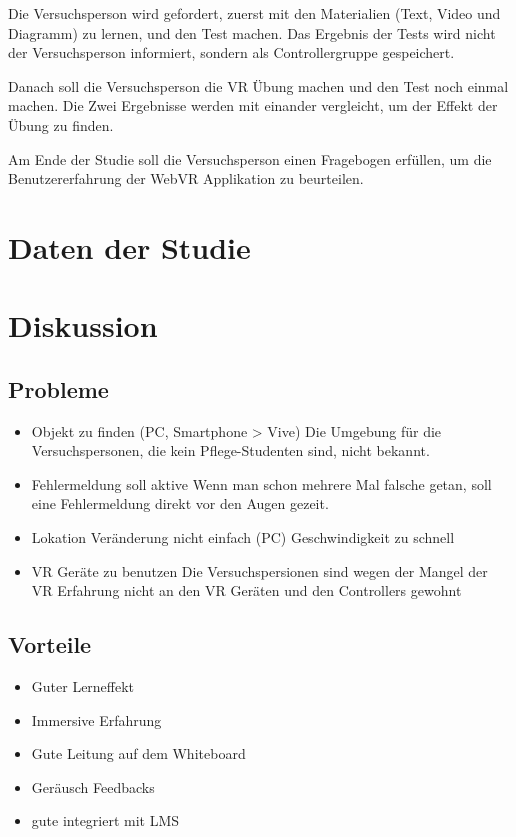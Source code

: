Die Versuchsperson wird gefordert, zuerst mit den Materialien (Text, Video und Diagramm) zu lernen, und den Test machen. Das Ergebnis der Tests wird nicht der Versuchsperson informiert, sondern als Controllergruppe gespeichert.

Danach soll die Versuchsperson die VR Übung machen und den Test noch einmal machen. Die Zwei Ergebnisse werden mit einander vergleicht, um der Effekt der Übung zu finden.

Am Ende der Studie soll die Versuchsperson einen Fragebogen erfüllen, um die Benutzererfahrung der WebVR Applikation zu beurteilen.

\section{Daten der Studie}

\section{Diskussion}

\subsection{Probleme}
\begin{itemize}
    \item Objekt zu finden (PC, Smartphone > Vive)
    Die Umgebung für die Versuchspersonen, die kein Pflege-Studenten sind, nicht bekannt.
    \item Fehlermeldung soll aktive
    Wenn man schon mehrere Mal falsche getan, soll eine Fehlermeldung direkt vor den Augen gezeit.
    \item Lokation Veränderung nicht einfach (PC)
    Geschwindigkeit zu schnell
    \item VR Geräte zu benutzen
    Die Versuchspersionen sind wegen der Mangel der VR Erfahrung nicht an den VR Geräten und den Controllers gewohnt
\end{itemize}

\subsection{Vorteile}
\begin{itemize}
    \item Guter Lerneffekt
    \item Immersive Erfahrung
    \item Gute Leitung auf dem Whiteboard
    \item Geräusch Feedbacks
    \item gute integriert mit LMS
    
\end{itemize}











